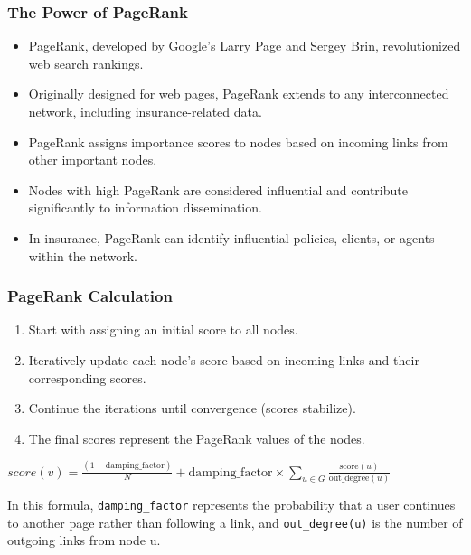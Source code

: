 \begin{frame}[fragile]\frametitle{The Power of PageRank}
\begin{itemize}
\item PageRank, developed by Google's Larry Page and Sergey Brin, revolutionized web search rankings.
\item Originally designed for web pages, PageRank extends to any interconnected network, including insurance-related data.
\item PageRank assigns importance scores to nodes based on incoming links from other important nodes.
\item Nodes with high PageRank are considered influential and contribute significantly to information dissemination.
\item In insurance, PageRank can identify influential policies, clients, or agents within the network.
\end{itemize}
\end{frame}

\begin{frame}[fragile]\frametitle{PageRank Calculation}
\begin{enumerate}
\item Start with assigning an initial score to all nodes.
\item Iteratively update each node's score based on incoming links and their corresponding scores.
\item Continue the iterations until convergence (scores stabilize).
\item The final scores represent the PageRank values of the nodes.
\end{enumerate}

$score(v) = \frac{{(1 - \text{damping\_factor})}}{N} + \text{damping\_factor} \times \sum_{u \in G} \frac{\text{score}(u)}{\text{out\_degree}(u)}$

In this formula, \lstinline|damping_factor| represents the probability that a user continues to another page rather than following a link, and \lstinline|out_degree(u)| is the number of outgoing links from node u.
\end{frame}

